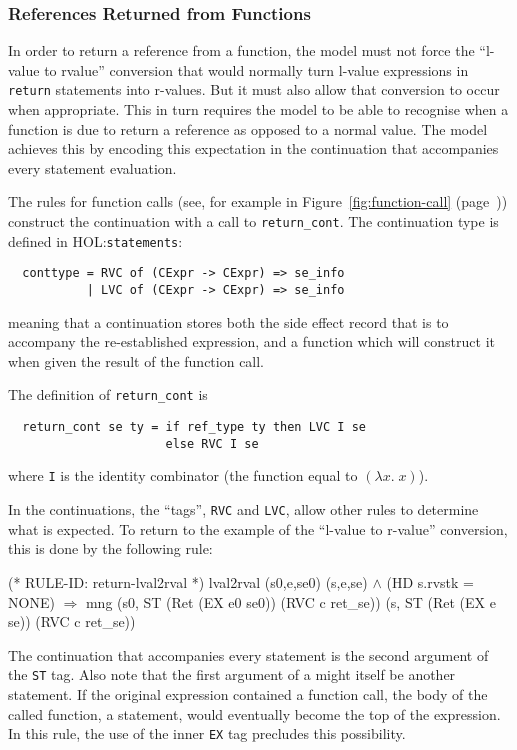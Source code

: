 \documentclass[11pt]{article}
\newcommand{\HOLfile}[1]{HOL:\texttt{#1}}
\begin{document}
\subsubsection{References Returned from Functions}
\label{sec:refs-returned-from-fns}

In order to return a reference from a function, the model must not
force the ``l-value to rvalue'' conversion that would normally turn
l-value expressions in \texttt{return} statements into r-values.  But
it must also allow that conversion to occur when appropriate.  This in
turn requires the model to be able to recognise when a function is due
to return a reference as opposed to a normal value.  The model
achieves this by encoding this expectation in the continuation that
accompanies every statement evaluation.

%
The rules for function calls (see, for example 
in Figure~\ref{fig:function-call} (page~\pageref{fig:function-call}))
construct the continuation with a call to \texttt{return_cont}.  The
continuation type is defined in \HOLfile{statements}:
\begin{verbatim}
  conttype = RVC of (CExpr -> CExpr) => se_info
           | LVC of (CExpr -> CExpr) => se_info
\end{verbatim}
meaning that a continuation stores both the side effect record that is
to accompany the re-established expression, and a function which will
construct it when given the result of the function call.

The definition of \texttt{return_cont} is
\begin{verbatim}
  return_cont se ty = if ref_type ty then LVC I se
                      else RVC I se
\end{verbatim}
where \texttt{I} is the identity combinator (the function equal to
$(\lambda x.\;x)$).

In the continuations, the ``tags'', \texttt{RVC} and \texttt{LVC},
allow other rules to determine what is expected.  To return to the
example of the ``l-value to r-value'' conversion, this is done by the
following rule:
%
%
\begin{stdrule}
(* RULE-ID: return-lval2rval *)
     lval2rval (s0,e,se0) (s,e,se) \(\land\)
     (HD s.rvstk = NONE)
   \(\Rightarrow\)
     mng (s0, ST (Ret (EX e0 se0)) (RVC c ret_se))
         (s, ST (Ret (EX e se)) (RVC c ret_se))
\end{stdrule}
The continuation that accompanies every statement is the second
argument of the \texttt{ST} tag. Also note that the first argument of
a  might itself be another statement.  If the original
expression contained a function call, the body of the called function,
a statement, would eventually become the top of the expression.  In
this rule, the use of the inner \texttt{EX} tag precludes this
possibility.
\end{document}
